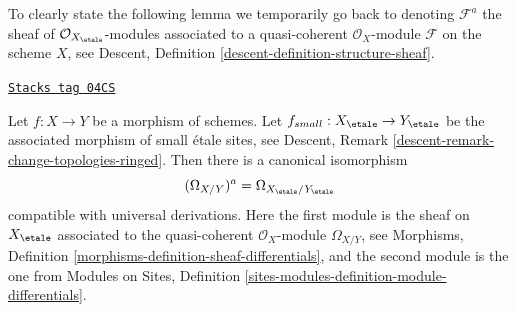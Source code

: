 \medskip\noindent
To clearly state the following lemma we temporarily go back to
denoting $\mathcal{F}^a$ the sheaf of $\mathcal{O}_{X_\etale}$-modules
associated to a quasi-coherent $\mathcal{O}_X$-module $\mathcal{F}$
on the scheme $X$, see
Descent, Definition \ref{descent-definition-structure-sheaf}.

\begin{lemma}
\label{spaces-more-morphisms-lemma-match-modules-differentials}
\href{https://stacks.math.columbia.edu/tag/04CS}{\texttt{Stacks tag 04CS}}

Let $f : X \to Y$ be a morphism of schemes. Let
$f_{small} : X_\etale \to Y_\etale$ be the associated
morphism of small \'etale sites, see
Descent, Remark \ref{descent-remark-change-topologies-ringed}.
Then there is a canonical isomorphism
$$
(\Omega_{X/Y})^a = \Omega_{X_\etale/Y_\etale}
$$
compatible with universal derivations. Here the first module
is the sheaf on $X_\etale$ associated
to the quasi-coherent $\mathcal{O}_X$-module $\Omega_{X/Y}$, see
Morphisms, Definition \ref{morphisms-definition-sheaf-differentials},
and the second module is the one from
Modules on Sites,
Definition \ref{sites-modules-definition-module-differentials}.
\end{lemma}

